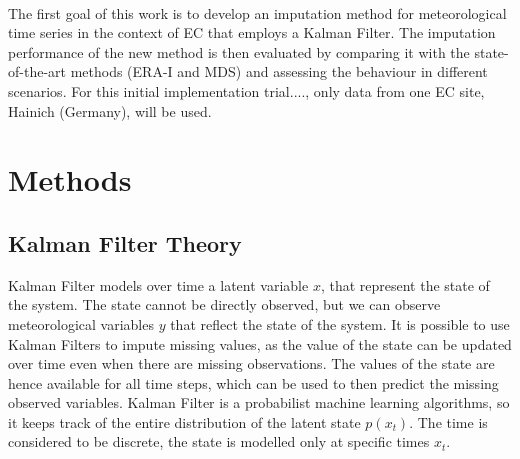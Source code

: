 \documentclass{article}
\let\Oldsection\section
\renewcommand{\section}{\FloatBarrier\Oldsection}
\let\Oldsubsection\subsection
\renewcommand{\subsection}{\FloatBarrier\Oldsubsection}
\begin{document}

\paragraph{} The first goal of this work is to develop an imputation method for meteorological time series in the context of EC that employs a Kalman Filter. The imputation performance of the new method is then evaluated by comparing it with the state-of-the-art methods (ERA-I and MDS) and assessing the behaviour in different scenarios. For this initial implementation trial...., only data from one EC site, Hainich (Germany), will be used.


\section{Methods}

\subsection{Kalman Filter Theory}

Kalman Filter models over time a latent variable $x$, that represent the state of the system. The state cannot be directly observed, but we can observe meteorological variables $y$ that reflect the state of the system. It is possible to use Kalman Filters to impute missing values, as the value of the state can be updated over time even when there are missing observations. The values of the state are hence available for all time steps, which can be used to then predict the missing observed variables.
Kalman Filter is a probabilist machine learning algorithms, so it keeps track of the entire distribution of the latent state $p(x_t)$. The time is considered to be discrete, the state is modelled only at specific times $x_t$.  
\end{document}
